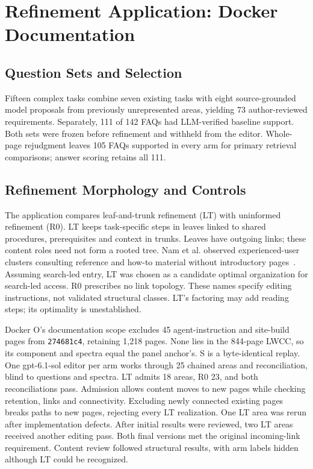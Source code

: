 \section{Refinement Application: Docker Documentation}
\label{sec:application}
\subsection{Question Sets and Selection}
Fifteen complex tasks combine seven existing tasks with eight source-grounded
model proposals from previously unrepresented areas, yielding 73 author-reviewed
requirements. Separately, 111 of 142 FAQs had LLM-verified baseline support.
Both sets were frozen before refinement and withheld from the editor.
Whole-page rejudgment leaves 105 FAQs supported in every arm for primary
retrieval comparisons; answer scoring retains all 111.

\subsection{Refinement Morphology and Controls}
The application compares leaf-and-trunk refinement (LT) with uninformed refinement (R0).
LT keeps task-specific steps in leaves linked to shared
procedures, prerequisites and context in trunks.
Leaves have outgoing links; these content roles need not form a rooted tree.
Nam et al. observed experienced-user clusters consulting reference and how-to
material without introductory pages~\cite{nam2024doc}. Assuming search-led entry,
LT was chosen as a candidate optimal organization for search-led access.
R0 prescribes no link topology. These names specify editing
instructions, not validated structural classes. LT's factoring may add reading
steps; its optimality is unestablished.



Docker O's documentation scope excludes 45 agent-instruction and site-build
pages from \texttt{274681c4}, retaining 1,218 pages. None lies in the
844-page LWCC, so its component and spectra equal the panel anchor's. S is a byte-identical replay. One gpt-6.1-sol editor per arm
works through 25 chained areas and reconciliation, blind to questions and
spectra. LT admits 18 areas, R0 23, and both reconciliations pass. Admission
allows content moves to new pages while checking retention, links and
connectivity. Excluding newly connected existing pages breaks paths to new
pages, rejecting every LT realization. One LT area was rerun
after implementation defects.
After initial results were reviewed, two LT areas received another editing pass.
Both final versions met the original incoming-link requirement.
Content review followed structural results, with arm labels hidden although LT
could be recognized.


